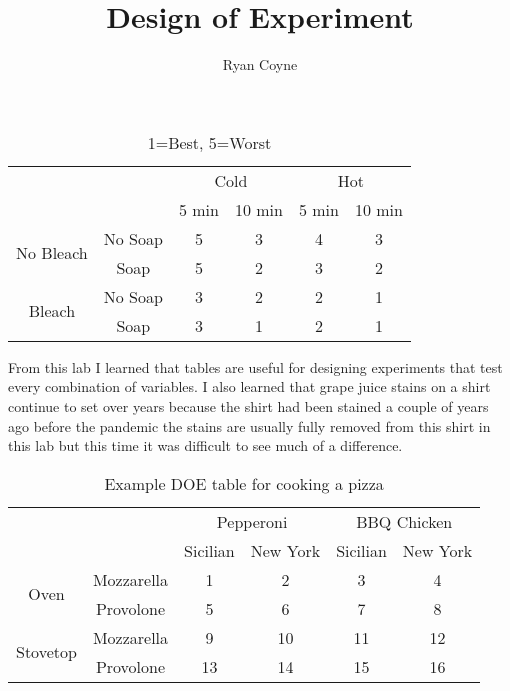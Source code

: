 \documentclass[12pt]{article}
\begin{document}
    \title{Design of Experiment}
    \author{Ryan Coyne}
    \maketitle
    \begin{table}[h]
        \centering
        \begin{tabular}{cc|cccc}
            &&\multicolumn{2}{c}{Cold} & \multicolumn{2}{c}{Hot}\\
            &&5 min & 10 min & 5 min & 10 min\\
            \hline
            \multirow{2}{*}{No Bleach} 
            & No Soap & 5 & 3 & 4 & 3\\
            & Soap & 5 & 2 & 3 & 2\\
            \multirow{2}{*}{Bleach} 
            & No Soap & 3 & 2 & 2 & 1\\
            & Soap & 3 & 1 & 2 & 1
        \end{tabular}
        \caption*{1=Best, 5=Worst}
    \end{table}
    
    From this lab I learned that tables are useful for designing experiments that test every combination of variables. I also learned that grape juice stains on a shirt continue to set over years because the shirt had been stained a couple of years ago before the pandemic the stains are usually fully removed from this shirt in this lab but this time it was difficult to see much of a difference.
    
    \begin{table}[H]
        \centering
        \caption*{Example DOE table for cooking a pizza}
        \begin{tabular}{cc|cccc}
            &&\multicolumn{2}{c}{Pepperoni} &\multicolumn{2}{c}{BBQ Chicken}\\
            &&Sicilian & New York & Sicilian & New York\\
            \hline
            \multirow{2}{*}{Oven}
            & Mozzarella & 1 & 2 & 3 & 4\\
            & Provolone & 5 & 6 & 7 & 8\\
            \multirow{2}{*}{Stovetop} & Mozzarella & 9 & 10 & 11 & 12\\
            & Provolone & 13 & 14 & 15 & 16
        \end{tabular}
    \end{table}
\end{document}
